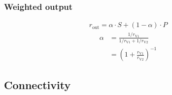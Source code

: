 \documentclass[10pt,a4paper,draft]{article}
\begin{document}
\subsubsection*{Weighted output}
%
\begin{align}
r_\mathrm{out} = \alpha \cdot S + (1-\alpha) \cdot P
\end{align}
%
\begin{align}
\alpha &= \frac{1/r_\mathrm{V1}}{1/r_\mathrm{V1} + 1/r_\mathrm{V2}}\nonumber\\
& = \left( 1 + \frac{r_\mathrm{V1}}{r_\mathrm{V2}} \right)^{-1}
\end{align}

\subsection*{Connectivity}
%
\end{document}
